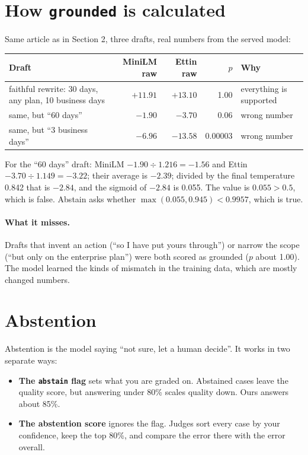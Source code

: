 \documentclass[11pt,a4paper]{article}
\begin{document}
\section{How \texttt{grounded} is calculated}
Same article as in Section 2, three drafts, real numbers from the served model:

\medskip
\noindent\begin{tabularx}{\linewidth}{@{}Lrrrp{3.2cm}@{}}
\toprule
Draft & MiniLM raw & Ettin raw & $p$ & Why \\
\midrule
faithful rewrite: 30 days, any plan, 10 business days & $+11.91$ & $+13.10$ & 1.00 & everything is supported \\
same, but ``60 days'' & $-1.90$ & $-3.70$ & 0.06 & wrong number \\
same, but ``3 business days'' & $-6.96$ & $-13.58$ & 0.00003 & wrong number \\
\bottomrule
\end{tabularx}

\medskip
\noindent For the ``60 days'' draft: MiniLM $-1.90 \div 1.216 = -1.56$ and Ettin
$-3.70 \div 1.149 = -3.22$; their average is $-2.39$; divided by the final temperature
0.842 that is $-2.84$, and the sigmoid of $-2.84$ is 0.055. The value is $0.055 > 0.5$,
which is false. Abstain asks whether $\max(0.055, 0.945) < 0.9957$, which is true.

\paragraph{What it misses.} Drafts that invent an action (``so I have put yours
through'') or narrow the scope (``but only on the enterprise plan'') were both scored as
grounded ($p$ about 1.00). The model learned the kinds of mismatch in the training data,
which are mostly changed numbers.

\section{Abstention}\label{sec:abstain}
Abstention is the model saying ``not sure, let a human decide''. It works in two separate
ways:
\begin{itemize}
  \item \textbf{The \texttt{abstain} flag} sets what you are graded on. Abstained cases
        leave the quality score, but answering under 80\% scales quality down. Ours answers
        about 85\%.
  \item \textbf{The abstention score} ignores the flag. Judges sort every case by your
        confidence, keep the top 80\%, and compare the error there with the error overall.
\end{itemize}
\end{document}
